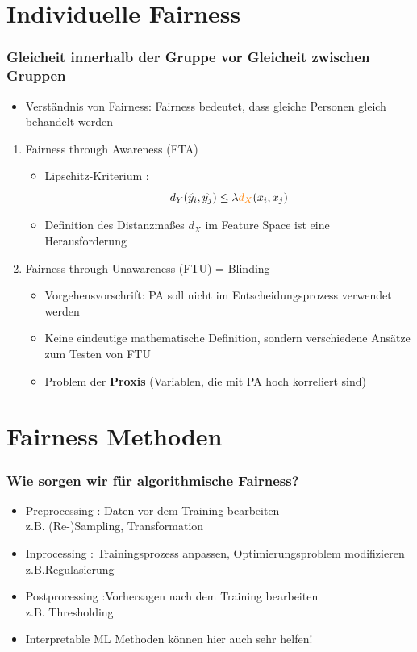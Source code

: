 \documentclass[aspectratio=169]{beamer}
\begin{document}
\section{Individuelle Fairness}
\begin{frame}
    \frametitle{Gleicheit innerhalb der Gruppe vor Gleicheit zwischen Gruppen}
	\begin{itemize}
		\item Verständnis von Fairness: Fairness bedeutet, dass gleiche Personen gleich behandelt werden
	\end{itemize}
    \begin{enumerate}
		\item<2-> Fairness through Awareness \cite{dwork2012} (FTA)
        \begin{itemize}
            \item<3-> Lipschitz-Kriterium \cite{castelnovo2022}:
            \[
            d_Y(\hat{y_i}, \hat{y_j}) \leq \lambda {\color{orange}{d_X}}(x_i, x_j)
            \] 
            \item<4-> Definition des {\color{orange}Distanzmaßes $d_X$} im Feature Space ist eine Herausforderung
        \end{itemize}
        \item<5-> Fairness through Unawareness (FTU) = Blinding
        \begin{itemize}
            \item<6-> Vorgehensvorschrift: PA soll nicht im Entscheidungsprozess verwendet werden
            \item<7-> Keine eindeutige mathematische Definition, sondern verschiedene Ansätze zum Testen von FTU
            \item<8-> Problem der \textbf{Proxis} (Variablen, die mit PA hoch korreliert sind)
        \end{itemize}
    \end{enumerate}
\end{frame}


\section{Fairness Methoden}
\begin{frame}
	\frametitle{Wie sorgen wir für algorithmische Fairness?}
	\begin{itemize}
		\item<1-> Preprocessing \cite{caton2024}: Daten vor dem Training bearbeiten \\ z.B. (Re-)Sampling, Transformation
		\item<2-> Inprocessing \cite{caton2024}: Trainingsprozess anpassen, Optimierungsproblem modifizieren \\ z.B.Regulasierung
		\item<3-> Postprocessing \cite{caton2024}:Vorhersagen nach dem Training bearbeiten \\ z.B. Thresholding
		\item<4-> Interpretable ML Methoden können hier auch sehr helfen!
	\end{itemize}
\end{frame}
\end{document}
